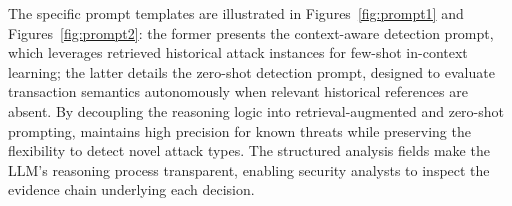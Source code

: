 The specific prompt templates are illustrated in Figures~\ref{fig:prompt1} and Figures~\ref{fig:prompt2}: the former presents the context-aware detection prompt, which leverages retrieved historical attack instances for few-shot in-context learning; the latter details the zero-shot detection prompt, designed to evaluate transaction semantics autonomously when relevant historical references are absent.
By decoupling the reasoning logic into retrieval-augmented and zero-shot prompting, \approach{} maintains high precision for known threats while preserving the flexibility to detect novel attack types. The structured analysis fields make the LLM's reasoning process transparent, enabling security analysts to inspect the evidence chain underlying each decision.

%
%




